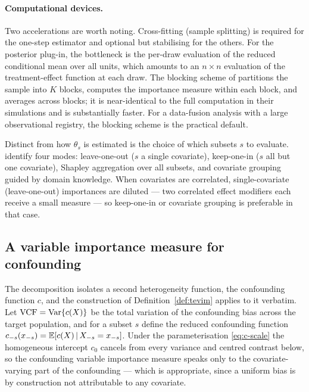 \paragraph{Computational devices.}
Two accelerations are worth noting. Cross-fitting (sample splitting) is required
for the one-step estimator and optional but stabilising for the others. For the
posterior plug-in, the bottleneck is the per-draw evaluation of the reduced
conditional mean over all units, which amounts to an $n \times n$ evaluation of
the treatment-effect function at each draw. The blocking scheme of
\citet{shin2024} partitions the sample into $K$ blocks, computes the importance
measure within each block, and averages across blocks; it is near-identical to
the full computation in their simulations and is substantially faster. For a
data-fusion analysis with a large observational registry, the blocking scheme is
the practical default.

\begin{remark}
\label{rem:vim-modes}
Distinct from how $\theta_s$ is estimated is the choice of which subsets $s$ to
evaluate. \citet{hines2022} identify four modes: leave-one-out ($s$ a single
covariate), keep-one-in ($s$ all but one covariate), Shapley aggregation over all
subsets, and covariate grouping guided by domain knowledge. When covariates are
correlated, single-covariate (leave-one-out) importances are diluted --- two
correlated effect modifiers each receive a small measure --- so keep-one-in or
covariate grouping is preferable in that case.
\end{remark}

\subsection{A variable importance measure for confounding}

The decomposition isolates a second heterogeneity function, the confounding
function $c$, and the construction of Definition~\ref{def:tevim} applies to it
verbatim. Let $\mathrm{VCF} = \mathrm{Var}\{c(X)\}$ be the total variation of the confounding
bias across the target population, and for a subset $s$ define the reduced
confounding function $c_{-s}(x_{-s}) = \mathbb{E}[c(X) \,\vert\, X_{-s} = x_{-s}]$. Under
the parameterisation \eqref{eq:c-scale} the homogeneous intercept $c_0$ cancels
from every variance and centred contrast below, so the confounding variable
importance measure speaks only to the covariate-varying part of the
confounding --- which is appropriate, since a uniform bias is by construction
not attributable to any covariate.

